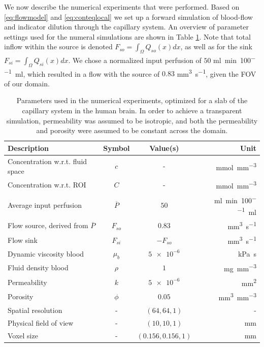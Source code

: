 \documentclass[paper=a4, fontsize=11pt,parskip=half,headings=small]{scrartcl}
\newcommand{\siqt}{\milli\meter\cubed\per\second}
\newcommand{\siJ}{\milli\mol\per\second\per\milli\meter\squared}
\newcommand{\sic}{\milli\mol\per\milli\meter\cubed}
\newcommand{\siPn}{\milli\litre\per\minute\per100\milli\litre}
\begin{document}
	We now describe the numerical experiments that were performed.
	Based on \eqref{eq:flowmodel} and \eqref{eq:conteqlocal} we set up a forward simulation of blood-flow and indicator dilution through the capillary system.
	An overview of parameter settings used for the numeral simulations are shown in Table \ref{tab:par}. Note that total inflow within the source is denoted $F_{so} = \int_\Omega Q_{so}(x) dx$, as well as for the sink $F_{si} = \int_\Omega Q_{si}(x) dx$. We chose a normalized input perfusion of $50$ \si{\siPn}, which resulted in a flow with the source of $0.83$ \si{\siqt}, given the FOV of our domain.
	\begin{table}[H]
		\centering
	  \caption{Parameters used in the numerical experiments, optimized for a slab of the capillary system in the human brain. In order to achieve a transparent simulation, permeability was assumed to be isotropic, and both the permeability and porosity were assumed to be constant across the domain.}		
		\begin{tabular}{ l  c  c  r }
		    Description 									& Symbol 			& Value(s) 				& Unit 				\\
			\toprule
			Concentration w.r.t. fluid space				& $c$				& - 					& \si{\sic} 		\\
			Concentration w.r.t. ROI						& $C$				& - 					& \si{\sic} 		\\
		    Average input perfusion 				 		& $\overline{P}$ 	& $50$ 					& \si{\siPn}		\\
			Flow source, derived from $\overline{P}$ 		& $F_{so}$ 			& \num{0.83}			& \si{\cubic\milli\meter\per\second} \\
			Flow sink 										& $F_{si}$ 			& $-F_{so}$ 		 	& \si{\cubic\milli\meter\per\second}  		\\
			Dynamic viscosity blood \cite{rosencranz06} 	& $\mu_b$ 			& $\num{5e-6}$ 			& \si{\kilo\pascal\second}  	\\
			Fluid density blood \cite{kenner89} 			& $\rho$ 			& $\num{1}$				& \si{\milli\gram\per\cubic\milli\meter} 		\\		
			Permeability  									& $k$ 				& $\num{5e-6}$ 			& \si{\square\milli\meter} 			\\	
			Porosity\cite{wu03}								& $\phi$ 			& $0.05$ 				& \si{\cubic\milli\meter\per\cubic\milli\meter}	\\	
			Spatial resolution 								& - 				& $(64,64,1)$ 			& -					\\
			Physical field of view 								& - 				& $(10,10,1)$ 			& \si{\milli\meter}				\\
			Voxel size 										& - 				& $(0.156,0.156,1)$ 	& \si{\milli\meter}	\\
	  \end{tabular}
	  \label{tab:par}
	\end{table}	
	
\end{document}

